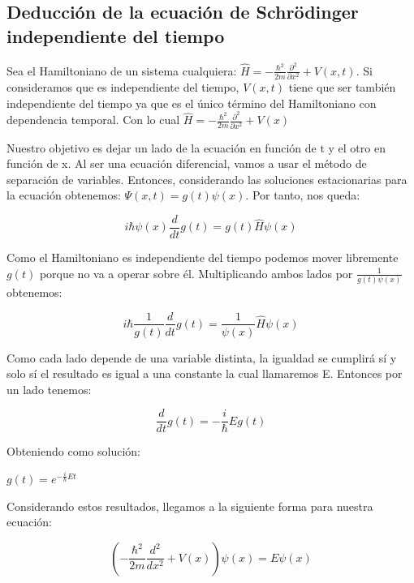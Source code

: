 \documentclass[12pt]{article}
\begin{document}
\subsection{Deducción de la ecuación de Schrödinger independiente del tiempo}
Sea el Hamiltoniano de un sistema cualquiera: 
$\hat{H}=-\frac{\hbar^{2}}{2m}\frac{\partial^{2}}{\partial x^{2}}+V(x,t)$.
Si consideramos que es independiente del tiempo, $V(x,t)$ tiene que ser también 
independiente del tiempo ya que es el único término del Hamiltoniano
con dependencia temporal. Con lo cual $\hat{H}=-\frac{\hbar^{2}}{2m}\frac{\partial^{2}}{\partial x^{2}}+V(x)$ \\
\par
Nuestro objetivo es dejar un lado de la ecuación en función de t y el otro en función de x. Al ser una ecuación diferencial, vamos a usar el método de separación de variables. Entonces, considerando las soluciones estacionarias para la ecuación obtenemos: $\Psi (x,t)= g(t) \psi(x)$. Por tanto, nos queda:

\begin{equation*}
i\hbar \psi (x) \frac{d}{d t}g(t)= g(t) \hat{H} \psi (x)
\end{equation*}

Como el Hamiltoniano es independiente del tiempo podemos mover libremente  $g(t)$ porque no va a operar sobre él. Multiplicando ambos  lados por $\frac{1}{g(t)\psi(x)}$ obtenemos:

\begin{equation*}
i\hbar \frac{1}{g(t)} \frac{d}{d t}g(t) = \frac{1}{\psi(x)} \hat{H} \psi (x)
\end{equation*}

Como cada lado depende de una variable distinta, la igualdad
se cumplirá sí y solo sí el resultado es igual a una constante la cual llamaremos E. Entonces por un lado tenemos:

\begin{equation*}
\frac{d}{d t}g(t)=-\frac{i}{\hbar} Eg(t)
\end{equation*}

Obteniendo como solución:

\begin{center}
    $g(t)= e^{-\frac{i}{\hbar}Et}$
\end{center} 

Considerando estos resultados, llegamos a la siguiente forma para nuestra ecuación:

\begin{equation}\label{eq:ESROW}
\left(-\frac{\hbar^{2}}{2m}\frac{d^{2}}{d x^{2}}+V(x)\right) \psi(x)=E \psi(x)
\end{equation}
\end{document}
